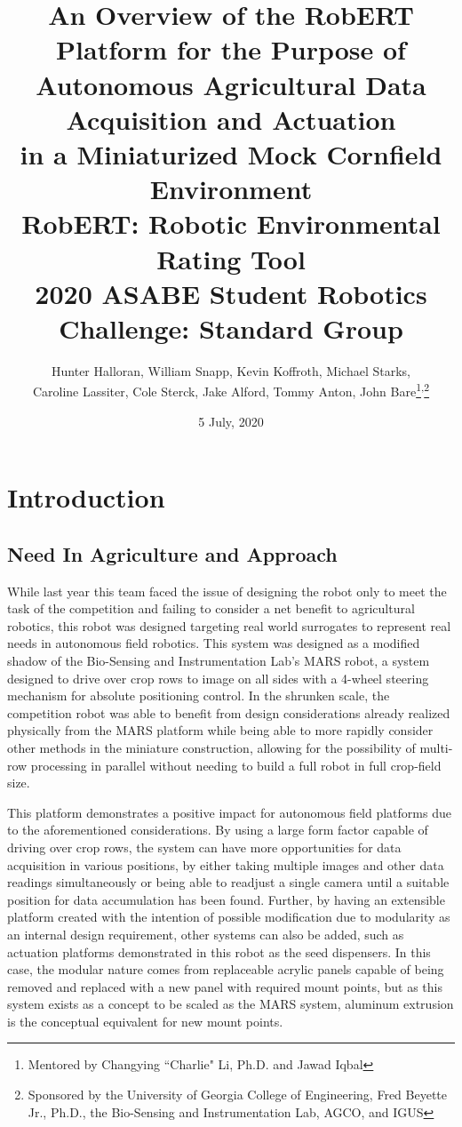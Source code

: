 \documentclass[11pt, hidelinks]{report}
\title{An Overview of the RobERT Platform for the Purpose of \\
Autonomous Agricultural Data Acquisition and Actuation \\ 
in a Miniaturized Mock Cornfield Environment\\ \bigskip \bigskip
RobERT: Robotic Environmental Rating Tool \\ \bigskip \bigskip
\Large 2020 ASABE Student Robotics Challenge: Standard Group}
\author{Hunter Halloran, William Snapp, Kevin Koffroth, Michael Starks, \\Caroline Lassiter, Cole Sterck, Jake Alford, Tommy Anton, John Bare\thanks {Mentored by Changying ``Charlie" Li, Ph.D. and Jawad Iqbal}\textsuperscript{,}\thanks{Sponsored by the University of Georgia College of Engineering, Fred Beyette Jr., Ph.D., the Bio-Sensing and Instrumentation Lab, AGCO, and IGUS}}
\date{5 July, 2020}
\begin{document}
\begin{titlepage}
\maketitle
\end{titlepage}

\newpage
\setcounter{tocdepth}{3}
\raggedbottom
\tableofcontents
\newpage

\section{Introduction}
\subsection{Need In Agriculture and Approach}
While last year this team faced the issue of designing the robot only to meet the task of the competition and failing to consider a net benefit to agricultural robotics, this robot was designed targeting real world surrogates to represent real needs in autonomous field robotics. This system was designed as a modified shadow of the Bio-Sensing and Instrumentation Lab’s MARS robot, a system designed to drive over crop rows to image on all sides with a 4-wheel steering mechanism for absolute positioning control. In the shrunken scale, the competition robot was able to benefit from design considerations already realized physically from the MARS platform while being able to more rapidly consider other methods in the miniature construction, allowing for the possibility of multi-row processing in parallel without needing to build a full robot in full crop-field size. 

This platform demonstrates a positive impact for autonomous field platforms due to the aforementioned considerations. By using a large form factor capable of driving over crop rows, the system can have more opportunities for data acquisition in various positions, by either taking multiple images and other data readings simultaneously or being able to readjust a single camera until a suitable position for data accumulation has been found. Further, by having an extensible platform created with the intention of possible modification due to modularity as an internal design requirement, other systems can also be added, such as actuation platforms demonstrated in this robot as the seed dispensers. In this case, the modular nature comes from replaceable acrylic panels capable of being removed and replaced with a new panel with required mount points, but as this system exists as a concept to be scaled as the MARS system, aluminum extrusion is the conceptual equivalent for new mount points.
\end{document}
